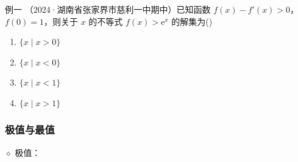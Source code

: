 \documentclass{article}
\begin{document}
\noindent 例一 （2024·湖南省张家界市慈利一中期中）已知函数 \(f(x) - f'(x) > 0\)，\(f(0) = 1\)，则关于 \(x\) 的不等式 \(f(x) > \mathrm{e}^x\) 的解集为(\;\;\;)

\begin{enumerate}
    \item[A.] \(\{x \mid x > 0\}\)
    \item[B.] \(\{x \mid x < 0\}\)
    \item[C.] \(\{x \mid x < 1\}\)
    \item[D.] \(\{x \mid x > 1\}\)
\end{enumerate}

\newpage

\subsubsection{极值与最值}

$\diamond$ 极值：
\end{document}
